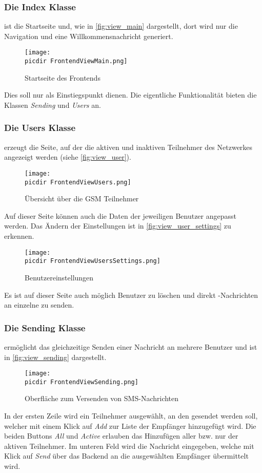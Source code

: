 \FloatBarrier
\subsubsection*{Die Index Klasse} ist die Startseite und, wie in \autoref{fig:view_main} dargestellt, dort wird nur die Navigation und eine Willkommensnachricht generiert. 
\begin{figure}[h]
	\centering
	\texttt{[image: \\picdir FrontendViewMain.png]}
	\caption{Startseite des Frontends}
	\label{fig:view_main}
\end{figure}
Dies soll nur als Einstiegspunkt dienen. Die eigentliche Funktionalität bieten die Klassen \emph{Sending} und \emph{Users} an. 

\FloatBarrier
\subsubsection*{Die Users Klasse} erzeugt die Seite, auf der die aktiven und inaktiven Teilnehmer des Netzwerkes angezeigt werden (siehe \autoref{fig:view_user}). 
\begin{figure}[h]
	\centering
	\texttt{[image: \\picdir FrontendViewUsers.png]}
	\caption{Übersicht über die GSM Teilnehmer}
	\label{fig:view_user}
\end{figure}
Auf dieser Seite können auch die Daten der jeweiligen Benutzer angepasst werden. Das Ändern der Einstellungen ist in \autoref{fig:view_user_settings} zu erkennen.
\begin{figure}[h]
	\centering
	\texttt{[image: \\picdir FrontendViewUsersSettings.png]}
	\caption{Benutzereinstellungen}
	\label{fig:view_user_settings}
\end{figure}
Es ist auf dieser Seite auch möglich Benutzer zu löschen und direkt \SMS-Nachrichten an einzelne zu senden.

\FloatBarrier
\subsubsection*{Die Sending Klasse}
ermöglicht das gleichzeitige Senden einer Nachricht an mehrere Benutzer und ist in \autoref{fig:view_sending} dargestellt.
\begin{figure}[h!]
	\centering
	\texttt{[image: \\picdir FrontendViewSending.png]}
	\caption{Oberfläche zum Versenden von \acs*{SMS}-Nachrichten}
	\label{fig:view_sending}
\end{figure}
In der ersten Zeile wird ein Teilnehmer ausgewählt, an den gesendet werden soll, welcher mit einem Klick auf \emph{Add} zur Liste der Empfänger hinzugefügt wird. Die beiden Buttons \emph{All} und \emph{Active} erlauben das Hinzufügen aller bzw. nur der aktiven Teilnehmer. Im unteren Feld wird die Nachricht eingegeben, welche mit Klick auf \emph{Send} über das Backend an die ausgewählten Empfänger übermittelt wird.

